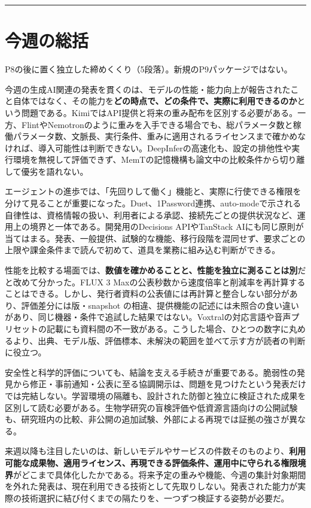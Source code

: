 \documentclass[lualatex,a4paper,10pt]{jlreq}
\begin{document}
\bigskip\hrule\bigskip


\section*{今週の総括}
\label{sec:recap}
{\small\color{SurveyMuted}P8の後に置く独立した締めくくり（5段落）。新規のP9パッケージではない。\par}
\bigskip


今週の生成AI関連の発表を貫くのは、モデルの性能・能力向上が報告されたこと自体ではなく、その能力を\textbf{どの時点で、どの条件で、実際に利用できるのか}という問題である。KimiではAPI提供と将来の重み配布を区別する必要がある。一方、FlintやNemotronのように重みを入手できる場合でも、総パラメータ数と稼働パラメータ数、文脈長、実行条件、重みに適用されるライセンスまで確かめなければ、導入可能性は判断できない。DeepInferの高速化も、設定の排他性や実行環境を無視して評価できず、MemTの記憶機構も論文中の比較条件から切り離して優劣を語れない。


エージェントの進歩では、「先回りして働く」機能と、実際に行使できる権限を分けて見ることが重要になった。Duet、1Password連携、auto-modeで示される自律性は、資格情報の扱い、利用者による承認、接続先ごとの提供状況など、運用上の境界と一体である。開発用のDecisions APIやTanStack AIにも同じ原則が当てはまる。発表、一般提供、試験的な機能、移行段階を混同せず、要求ごとの上限や課金条件まで読んで初めて、道具を業務に組み込む判断ができる。


性能を比較する場面では、\textbf{数値を確かめることと、性能を独立に測ることは別}だと改めて分かった。FLUX 3 Maxの公表秒数から速度倍率と削減率を再計算することはできる。しかし、発行者資料の公表値には再計算と整合しない部分があり、評価差分には版・snapshot の相違、提供機能の記述には未照合の食い違いがあり、同じ機器・条件で追試した結果ではない。Voxtralの対応言語や音声プリセットの記載にも資料間の不一致がある。こうした場合、ひとつの数字に丸めるより、出典、モデル版、評価標本、未解決の範囲を並べて示す方が読者の判断に役立つ。


安全性と科学的評価についても、結論を支える手続きが重要である。脆弱性の発見から修正・事前通知・公表に至る協調開示は、問題を見つけたという発表だけでは完結しない。学習環境の隔離も、設計された防御と独立に検証された成果を区別して読む必要がある。生物学研究の盲検評価や低資源言語向けの公開試験も、研究班内の比較、非公開の追加試験、外部による再現では証拠の強さが異なる。


来週以降も注目したいのは、新しいモデルやサービスの件数そのものより、\textbf{利用可能な成果物、適用ライセンス、再現できる評価条件、運用中に守られる権限境界}がどこまで具体化したかである。将来予定の重みや機能、今週の集計対象期間を外れた発表は、現在利用できる技術として先取りしない。発表された能力が実際の技術選択に結び付くまでの隔たりを、一つずつ検証する姿勢が必要だ。
\end{document}

